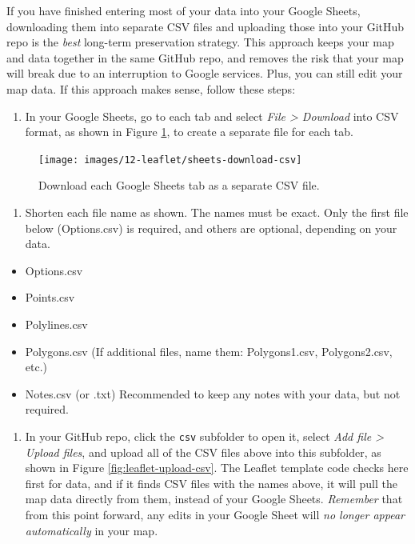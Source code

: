 \documentclass[
  english,
]{book}
\providecommand{\tightlist}{%
  \setlength{\itemsep}{0pt}\setlength{\parskip}{0pt}}
\begin{document}
If you have finished entering most of your data into your Google Sheets, downloading them into separate CSV files and uploading those into your GitHub repo is the \emph{best} long-term preservation strategy. This approach keeps your map and data together in the same GitHub repo, and removes the risk that your map will break due to an interruption to Google services. Plus, you can still edit your map data. If this approach makes sense, follow these steps:

\begin{enumerate}
\def\labelenumi{\arabic{enumi}.}
\tightlist
\item
  In your Google Sheets, go to each tab and select \emph{File \textgreater{} Download} into CSV format, as shown in Figure \ref{fig:sheets-download-csv}, to create a separate file for each tab.
\end{enumerate}



\begin{figure}
\texttt{[image: images/12-leaflet/sheets-download-csv]} \caption{Download each Google Sheets tab as a separate CSV file.}\label{fig:sheets-download-csv}
\end{figure}

\begin{enumerate}
\def\labelenumi{\arabic{enumi}.}
\setcounter{enumi}{1}
\tightlist
\item
  Shorten each file name as shown. The names must be exact. Only the first file below (Options.csv) is required, and others are optional, depending on your data.
\end{enumerate}

\begin{itemize}
\tightlist
\item
  Options.csv
\item
  Points.csv
\item
  Polylines.csv
\item
  Polygons.csv (If additional files, name them: Polygons1.csv, Polygons2.csv, etc.)
\item
  Notes.csv (or .txt) Recommended to keep any notes with your data, but not required.
\end{itemize}

\begin{enumerate}
\def\labelenumi{\arabic{enumi}.}
\setcounter{enumi}{2}
\tightlist
\item
  In your GitHub repo, click the \texttt{csv} subfolder to open it, select \emph{Add file \textgreater{} Upload files}, and upload all of the CSV files above into this subfolder, as shown in Figure \ref{fig:leaflet-upload-csv}. The Leaflet template code checks here first for data, and if it finds CSV files with the names above, it will pull the map data directly from them, instead of your Google Sheets. \emph{Remember} that from this point forward, any edits in your Google Sheet will \emph{no longer appear automatically} in your map.
\end{enumerate}
\end{document}
